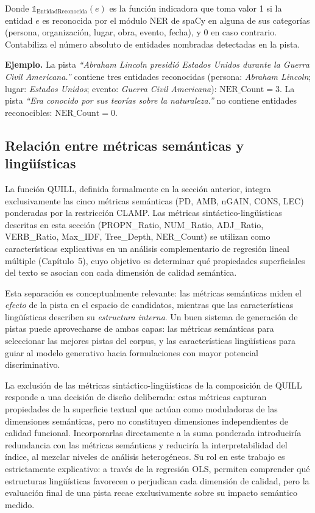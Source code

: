 \documentclass[../main.tex]{subfiles}
\begin{document}
Donde $\mathbb{1}_{\text{EntidadReconocida}}(e)$ es la función indicadora que toma valor 1 si la entidad $e$ es reconocida por el módulo NER de spaCy en alguna de sus categorías (persona, organización, lugar, obra, evento, fecha), y 0 en caso contrario. Contabiliza el número absoluto de entidades nombradas detectadas en la pista.

\medskip
\textbf{Ejemplo.} La pista \textit{``Abraham Lincoln presidió Estados Unidos durante la Guerra Civil Americana.''} contiene tres entidades reconocidas (persona: \textit{Abraham Lincoln}; lugar: \textit{Estados Unidos}; evento: \textit{Guerra Civil Americana}): $\text{NER\_Count} = 3$. La pista \textit{``Era conocido por sus teorías sobre la naturaleza.''} no contiene entidades reconocibles: $\text{NER\_Count} = 0$.

\subsection{Relación entre métricas semánticas y lingüísticas}

La función QUILL, definida formalmente en la sección anterior, integra exclusivamente las cinco métricas semánticas (PD, AMB, nGAIN, CONS, LEC) ponderadas por la restricción CLAMP. Las métricas sintáctico-lingüísticas descritas en esta sección (PROPN\_Ratio, NUM\_Ratio, ADJ\_Ratio, VERB\_Ratio, Max\_IDF, Tree\_Depth, NER\_Count) se utilizan como características explicativas en un análisis complementario de regresión lineal múltiple (Capítulo~5), cuyo objetivo es determinar qué propiedades superficiales del texto se asocian con cada dimensión de calidad semántica.

Esta separación es conceptualmente relevante: las métricas semánticas miden el \textit{efecto} de la pista en el espacio de candidatos, mientras que las características lingüísticas describen su \textit{estructura interna}. Un buen sistema de generación de pistas puede aprovecharse de ambas capas: las métricas semánticas para seleccionar las mejores pistas del corpus, y las características lingüísticas para guiar al modelo generativo hacia formulaciones con mayor potencial discriminativo.

La exclusión de las métricas sintáctico-lingüísticas de la composición de QUILL responde a una decisión de diseño deliberada: estas métricas capturan propiedades de la superficie textual que actúan como moduladoras de las dimensiones semánticas, pero no constituyen dimensiones independientes de calidad funcional. Incorporarlas directamente a la suma ponderada introduciría redundancia con las métricas semánticas y reduciría la interpretabilidad del índice, al mezclar niveles de análisis heterogéneos. Su rol en este trabajo es estrictamente explicativo: a través de la regresión OLS, permiten comprender qué estructuras lingüísticas favorecen o perjudican cada dimensión de calidad, pero la evaluación final de una pista recae exclusivamente sobre su impacto semántico medido.
\end{document}
